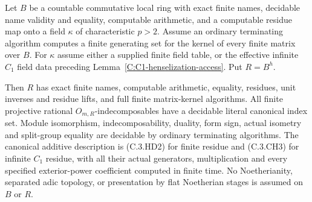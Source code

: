 \begin{theorem}
\label{C:effective-coherent-henselization-WG}
Let $B$ be a countable commutative local ring
with exact finite names, decidable name validity
and equality, computable arithmetic, and a
computable residue map onto a field $\kappa$
of characteristic $p>2$.
Assume an ordinary terminating algorithm
computes a finite generating set for the
kernel of every finite matrix over $B$.
For $\kappa$ assume either a supplied finite
field table, or the effective infinite
$C_1$ field data preceding
Lemma~\ref{C:C1-henselization-access}.
Put $R=B^h$.

Then $R$ has exact finite names, computable
arithmetic, equality, residues, unit inverses
and residue lifts, and full finite matrix-kernel
algorithms.  All finite projective rational
$O_{m,R}$-indecomposables have a decidable
literal canonical index set.
Module isomorphism, indecomposability, duality,
form sign, actual isometry and split-group
equality are decidable by ordinary terminating
algorithms.
The canonical additive description is
(C.3.HD2) for finite residue and (C.3.CH3)
for infinite $C_1$ residue, with all their
actual generators, multiplication and every
specified exterior-power coefficient computed
in finite time.
No Noetherianity, separated adic topology,
or presentation by flat Noetherian stages
is assumed on $B$ or $R$.
\end{theorem}

